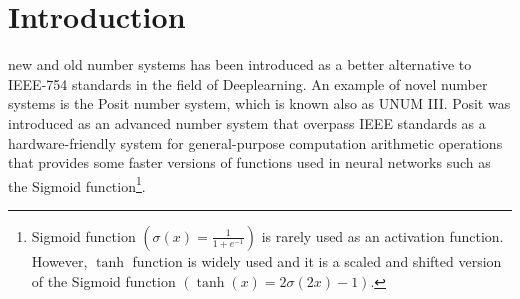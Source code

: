 \section{Introduction}

 new and old number systems has been introduced as a better alternative to IEEE-754 standards\cite{754} in the field of Deeplearning. An example of novel number systems is the Posit number system\cite{Gustafson2017}, which is known also as UNUM III. Posit was introduced as an advanced number system that overpass IEEE standards as a hardware-friendly system for general-purpose computation arithmetic operations that provides some faster versions of functions used in neural networks such as the Sigmoid function\footnote{Sigmoid function $\left(\sigma(x) = \frac{1}{1 + e^{-1}}\right)$ is rarely used as an activation function. However, $\tanh$ function is widely used and it is a scaled and shifted version of the Sigmoid function $\left(\tanh(x) = 2 \sigma(2x) -1\right)$.}. 